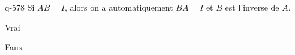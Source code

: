 \begin{truefalse}{q-578}
Si $AB=I$, alors on a automatiquement $BA=I$ et $B$ est l'inverse de $A$.
\item Vrai
\item* Faux
\end{truefalse}

